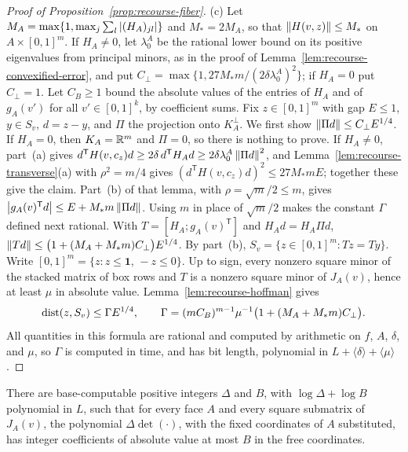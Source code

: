 \begin{proof}[Proof of Proposition~\ref{prop:recourse-fiber}]
(c) Let $M_A=\max\{1,\max_j\sum_l\left\lvert(H_A)_{jl}\right\rvert\}$ and $M_*=2M_A$, so
that $\left\lVert H(v,z)\right\rVert\le M_*$ on $A\times[0,1]^m$. If $H_A\ne0$, let
$\lambda_0^A$ be the rational lower bound on its positive eigenvalues
from principal minors, as in the proof of
Lemma~\ref{lem:recourse-convexified-error}, and put
$C_\perp=\max\{1,27M_*m/(2\delta\lambda_0^A)^2\}$; if $H_A=0$ put
$C_\perp=1$. Let $C_B\ge1$ bound the absolute values of the entries of
$H_A$ and of $g_A(v')$ for all $v'\in[0,1]^k$, by coefficient sums. Fix
$z\in[0,1]^m$ with gap $E\le1$, $y\in S_v$, $d=z-y$, and $\Pi$ the
projection onto $K_A^\perp$. We first show
$\left\lVert\Pi d\right\rVert\le C_\perp E^{1/4}$. If $H_A=0$, then $K_A=\mathbb R^m$ and
$\Pi=0$, so there is nothing to prove. If $H_A\ne0$, part~(a) gives
$d^{\mathsf T}H(v,c_z)d\ge2\delta\,d^{\mathsf T}H_Ad
\ge2\delta\lambda_0^A\left\lVert\Pi d\right\rVert^2$, and
Lemma~\ref{lem:recourse-transverse}(a) with $\rho^2=m/4$ gives
$(d^{\mathsf T}H(v,c_z)d)^2\le27M_*mE$; together these give the claim.
Part~(b) of that lemma, with $\rho=\sqrt m/2\le m$, gives
$\left\lvert g_A(v)^{\mathsf T}d\right\rvert\le E+M_*m\left\lVert\Pi d\right\rVert$. Using $m$ in place of
$\sqrt m/2$ makes the constant $\Gamma$ defined next rational. With
$T=[H_A;g_A(v)^{\mathsf T}]$ and
$H_Ad=H_A\Pi d$,
$\left\lVert Td\right\rVert\le\bigl(1+(M_A+M_*m)C_\perp\bigr)E^{1/4}$.
By part~(b), $S_v=\{z\in[0,1]^m:Tz=Ty\}$. Write
$[0,1]^m=\{z:z\le\mathbf1,\,-z\le0\}$. Up to sign, every nonzero square
minor of the stacked matrix of box rows and $T$ is a nonzero square
minor of $J_A(v)$, hence at least $\mu$ in absolute value.
Lemma~\ref{lem:recourse-hoffman} gives
\[
 \operatorname{dist}(z,S_v)\le\Gamma E^{1/4},\qquad
 \Gamma=(mC_B)^{m-1}\mu^{-1}\bigl(1+(M_A+M_*m)C_\perp\bigr).
\]
All quantities in this formula are rational and computed by arithmetic
on $f$, $A$, $\delta$, and $\mu$, so $\Gamma$ is computed in time, and
has bit length, polynomial in $L+\langle\delta\rangle+\langle\mu\rangle$.
\end{proof}

\begin{lemma}
\label{lem:recourse-minor-heights}
There are base-computable positive integers $\Delta$ and $B$, with
$\log\Delta+\log B$ polynomial in $L$, such that for every face $A$ and
every square submatrix of $J_A(v)$, the polynomial $\Delta\det(\cdot)$,
with the fixed coordinates of $A$ substituted, has integer coefficients
of absolute value at most $B$ in the free coordinates.
\end{lemma}


